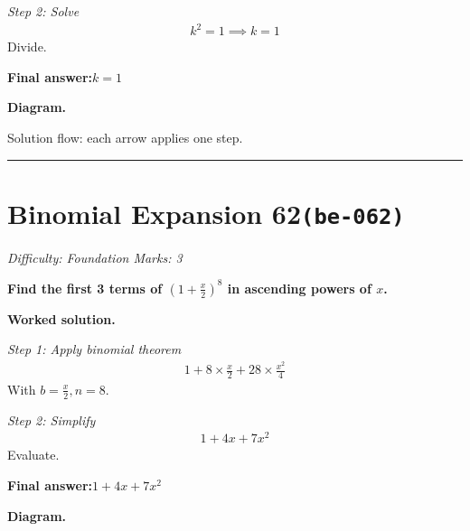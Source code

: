 \documentclass[11pt]{article}
\newcommand{\question}[1]{\par\medskip\noindent\textbf{#1}\par}
\begin{document}
\textit{Step 2: Solve}
\[\begin{gathered}
k^2 = 1 \implies k = 1
\end{gathered}\]
Divide.

\begin{answerbox}
\textbf{Final answer:}\quad \(\displaystyle k = 1\)
\end{answerbox}
\textbf{Diagram.}

\begin{center}
\end{center}
\small Solution flow: each arrow applies one step.\normalsize

\medskip\hrule

\section*{Binomial Expansion 62\quad\small\texttt{(be-062)}}
\textit{Difficulty: Foundation \quad\textbar\quad Marks: 3}

\question{Find the first 3 terms of \( (1 + \frac{x}{2})^8 \) in ascending powers of \( x \).}

\textbf{Worked solution.}

\textit{Step 1: Apply binomial theorem}
\[\begin{gathered}
1 + 8 \times \frac{x}{2} + 28 \times \frac{x^2}{4}
\end{gathered}\]
With \( b = \frac{x}{2}, n = 8 \).

\textit{Step 2: Simplify}
\[\begin{gathered}
1 + 4x + 7x^2
\end{gathered}\]
Evaluate.

\begin{answerbox}
\textbf{Final answer:}\quad \(\displaystyle 1 + 4x + 7x^2\)
\end{answerbox}
\textbf{Diagram.}
\end{document}
